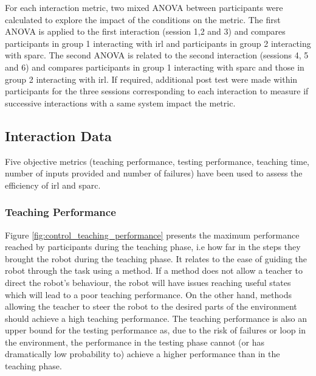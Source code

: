 For each interaction metric, two mixed ANOVA between participants were calculated to explore the impact of the conditions on the metric. The first ANOVA is applied to the first interaction (session 1,2 and 3) and compares participants in group 1 interacting with \gls{irl} and participants in group 2 interacting with \gls{sparc}. The second ANOVA is related to the second interaction (sessions 4, 5 and 6) and compares participants in group 1 interacting with \gls{sparc} and those in group 2 interacting with \gls{irl}. If required, additional post test were made within participants for the three sessions corresponding to each interaction to measure if successive interactions with a same system impact the metric.



\subsection{Interaction Data}

Five objective metrics (teaching performance, testing performance, teaching time, number of inputs provided and number of failures) have been used to assess the efficiency of \gls{irl} and \gls{sparc}. 

\subsubsection{Teaching Performance}

Figure \ref{fig:control_teaching_performance} presents the maximum performance reached by participants during the teaching phase, i.e how far in the steps they brought the robot during the teaching phase. It relates to the ease of guiding the robot through the task using a method. If a method does not allow a teacher to direct the robot's behaviour, the robot will have issues reaching useful states which will lead to a poor teaching performance. On the other hand, methods allowing the teacher to steer the robot to the desired parts of the environment should achieve a high teaching performance. The teaching performance is also an upper bound for the testing performance as, due to the risk of failures or loop in the environment, the performance in the testing phase cannot (or has dramatically low probability to) achieve a higher performance than in the teaching phase.

